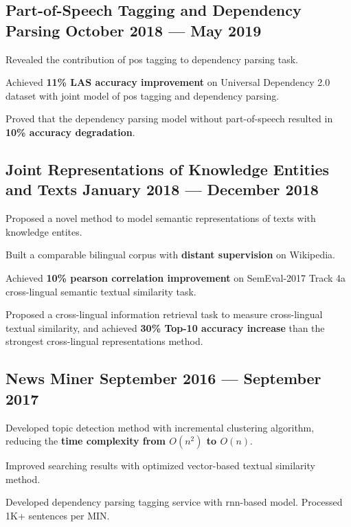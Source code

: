 \subsection*{Part-of-Speech Tagging and Dependency Parsing \hfill October 2018 --- May 2019} 
    \begin{zitemize}
        \item Revealed the contribution of pos tagging to dependency parsing task.
        \item Achieved \textbf{11\% LAS accuracy improvement} on Universal Dependency 2.0 dataset with joint model of pos tagging and dependency parsing.
        \item Proved that the dependency parsing model without part-of-speech resulted in \textbf{10\% accuracy degradation}.
    \end{zitemize}


\subsection*{Joint Representations of Knowledge Entities and Texts \hfill January 2018 --- December 2018} 
    \begin{zitemize}
        \item Proposed a novel method to model semantic representations of texts with knowledge entites.
        \item Built a comparable bilingual corpus with \textbf{distant supervision} on Wikipedia.
        \item Achieved \textbf{10\% pearson correlation improvement} on SemEval-2017 Track 4a cross-lingual semantic textual similarity task.
        \item Proposed a cross-lingual information retrieval task to measure cross-lingual textual similarity, and achieved \textbf{30\% Top-10 accuracy increase} than the strongest cross-lingual representations method.
    \end{zitemize}


\subsection*{News Miner \hfill September 2016 --- September 2017} 
    \begin{zitemize}
        \item Developed topic detection method with incremental clustering algorithm, reducing the \textbf{time complexity from $O(n^2)$ to $O(n)$}.
        \item Improved searching results with optimized vector-based textual similarity method.
        \item Developed dependency parsing tagging service with rnn-based model. Processed 1K+ sentences per MIN.
    \end{zitemize}
